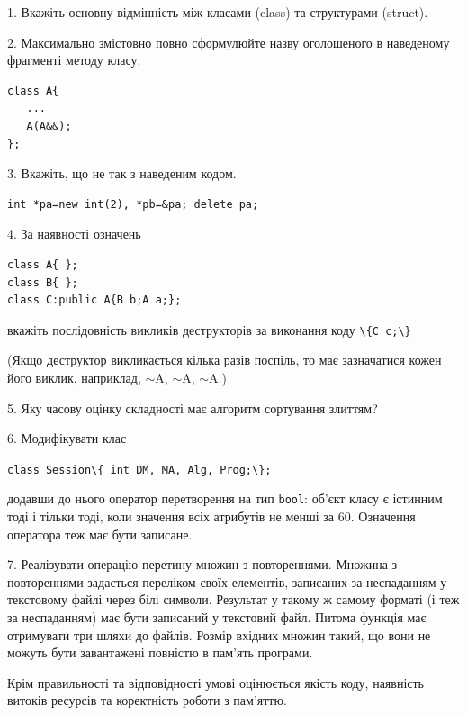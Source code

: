 \documentclass[12pt, ukrainian]{article}
\def\code#1{\Verb!#1!}
\begin{document}
{%
1. Вкажіть основну відмінність між класами (class) та структурами (struct).%
\par
\vspace{2mm}
2. Максимально змістовно повно сформулюйте назву оголошеного в наведеному фрагменті методу класу.
\vspace{-3mm}
\begin{verbatim}class A{
   ...
   A(A&&);
};\end{verbatim}
\vspace{-3mm}
\par
\vspace{2mm}
3. Вкажіть, що не так з наведеним кодом.
\vspace{-3mm}
\begin{verbatim}int *pa=new int(2), *pb=&pa; delete pa;\end{verbatim}
\vspace{-3mm}
\par
\vspace{2mm}
4. За наявності означень
\vspace{-3mm}
\begin{verbatim}
class A{ };
class B{ };
class C:public A{B b;A a;};\end{verbatim}
\vspace{-3mm}
вкажіть послідовність викликів деструкторів за виконання коду \code{\{C c;\}} 

(Якщо деструктор викликається кілька разів поспіль, то має зазначатися кожен його виклик, наприклад, $\sim$A, $\sim$A, $\sim$A.)

\vspace{2mm}
5. Яку часову оцінку складності має алгоритм сортування злиттям?
\par
\vspace{2mm}
6. Модифікувати клас 

\qquad\code{class Session\{ int DM, MA, Alg, Prog;\};} 


додавши до нього оператор перетворення на тип \code{bool}: об'єкт класу є істинним тоді і тільки тоді, коли значення всіх атрибутів не менші за 60. Означення оператора теж має бути записане.%
\par
\vspace{2mm}
7. 
Реалізувати операцію перетину множин з повтореннями. Множина з повтореннями задається переліком своїх елементів, записаних за неспаданням у текстовому файлі через білі символи. Результат у такому ж самому форматі (і теж за неспаданням) має бути записаний у текстовий файл. Питома функція має отримувати три шляхи до файлів. Розмір вхідних множин такий, що вони не можуть бути завантажені повністю в пам’ять програми.

Крім правильності та відповідності умові оцінюється якість коду, наявність витоків ресурсів та коректність роботи з пам'яттю. 

}
\end{document}
